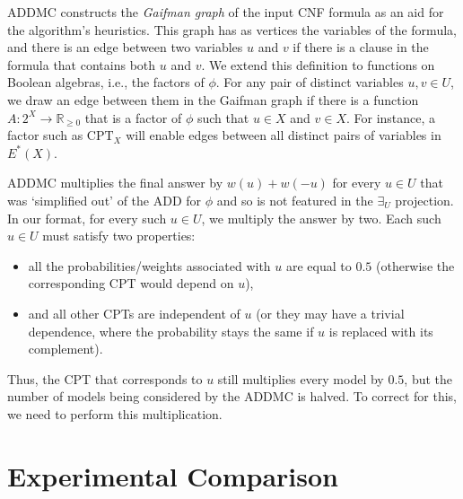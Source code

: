 \documentclass{article}
\theoremstyle{definition}
\theoremstyle{remark}
\begin{document}
ADDMC constructs the \emph{Gaifman graph} \cite{gaifman1982local} of the input
CNF formula as an aid for the algorithm's heuristics. This graph has as vertices
the variables of the formula, and there is an edge between two variables $u$ and
$v$ if there is a clause in the formula that contains both $u$ and $v$. We
extend this definition to functions on Boolean algebras, i.e., the factors of
$\phi$. For any pair of distinct variables $u, v \in U$, we draw an edge between
them in the Gaifman graph if there is a function $A\colon 2^X \to
\mathbb{R}_{\ge 0}$ that is a factor of $\phi$ such that $u \in X$ and $v \in
X$. For instance, a factor such as $\mathrm{CPT}_X$ will enable edges between
all distinct pairs of variables in $E^*(X)$.

ADDMC multiplies the final answer by $w(u)+w(-u)$ for every $u \in U$ that was
`simplified out' of the ADD for $\phi$ and so is not featured in the $\exists_U$
projection. In our format, for every such $u \in U$, we multiply the answer by
two. Each such $u \in U$ must satisfy two properties:
\begin{itemize}
\item all the probabilities/weights associated with $u$ are equal to $0.5$
  (otherwise the corresponding CPT would depend on $u$),
\item and all other CPTs are independent of $u$ (or they may have a trivial
  dependence, where the probability stays the same if $u$ is replaced with its
  complement).
\end{itemize}
Thus, the CPT that corresponds to $u$ still multiplies every model by $0.5$, but
the number of models being considered by the ADDMC is halved. To correct for
this, we need to perform this multiplication.

\section{Experimental Comparison} \label{sec:experiments}
\end{document}
